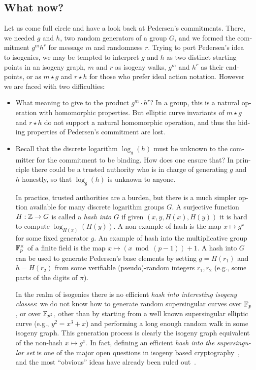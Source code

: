 \begin{otherlanguage}{english}
\section{What now?}

Let us come full circle and have a look back at Pedersen's
commitments. There, we needed $g$ and $h$, two random generators of a
group $G$, and we formed the commitment $g^mh^r$ for message $m$ and
randomness $r$.  Trying to port Pedersen's idea to isogenies, we may
be tempted to interpret $g$ and $h$ as two distinct starting points in
an isogeny graph, $m$ and $r$ as isogeny walks, $g^m$ and $h^r$ as
their endpoints, or as $m\star g$ and $r\star h$ for those who prefer
ideal action notation. However we are faced with two difficulties:
\begin{itemize}
\item What meaning to give to the product $g^m\cdot h^r$? In a group,
  this is a natural operation with homomorphic properties. But
  elliptic curve invariants of $m\star g$ and $r\star h$ do not
  support a natural homomorphic operation, and thus the hiding
  properties of Pedersen's commitment are lost.
\item Recall that the discrete logarithm $\log_g(h)$ must be unknown
  to the committer for the commitment to be binding. How does one
  ensure that? In principle there could be a trusted authority who is
  in charge of generating $g$ and $h$ honestly, so that $\log_g(h)$ is
  unknown to anyone.

  In practice, trusted authorities are a burden, but there is a much
  simpler option available for many discrete logarithm groups $G$. A
  surjective function $H:\mathbb{Z}\to G$ is called a \emph{hash into $G$} if
  given $(x,y,H(x),H(y))$ it is hard to compute $\log_{H(x)}(H(y))$. A
  non-example of hash is the map $x\mapsto g^x$ for some fixed
  generator $g$. An example of hash into the multiplicative group
  $\mathbb{F}_p^\times$ of a finite field is the map
  $x\mapsto (x\bmod(p-1)) + 1$.  A hash into $G$ can be used to
  generate Pedersen's base elements by setting $g=H(r_1)$ and
  $h=H(r_2)$ from some verifiable (pseudo)-random integers $r_1,r_2$
  (e.g., some parts of the digits of $\pi$).

  In the realm of isogenies there is no efficient \emph{hash into
    interesting isogeny classes}: we do not know how to generate
  random supersingular curves over $\mathbb{F}_p$, or over $\mathbb{F}_{p^2}$, other
  than by starting from a well known supersingular elliptic curve
  (e.g., $y^2=x^3+x$) and performing a long enough random walk in some
  isogeny graph. This generation process is clearly the isogeny graph
  equivalent of the non-hash $x\mapsto g^x$.  In fact, defining an
  efficient \emph{hash into the supersingular set} is one of the major
  open questions in isogeny based
  cryptography~\cite{galbraith2018computational}, and the most
  ``obvious'' ideas have already been ruled
  out~\cite{EC:CasPanVer20,love2020supersingular}.
\end{itemize}


\end{otherlanguage}
